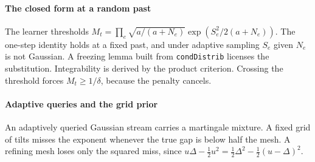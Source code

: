 
\paragraph{The closed form at a random past} The learner thresholds
$M_{t}=\prod_{e}\sqrt{a/(a+N_{e})}\exp(S_{e}^{2}/2(a+N_{e}))$. The one-step identity holds at a
fixed past, and under adaptive sampling $S_{e}$ given $N_{e}$ is not Gaussian. A freezing lemma
built from \texttt{condDistrib} licenses the substitution. Integrability is derived by the
product criterion. Crossing the threshold forces $M_{t}\ge1/\delta$, because the penalty
cancels.


\paragraph{Adaptive queries and the grid prior} An adaptively queried Gaussian stream carries a
martingale mixture. A fixed grid of tilts misses the exponent whenever the true gap is below
half the mesh. A refining mesh loses only the squared miss, since
$u\Delta-\frac12u^{2}=\frac12\Delta^{2}-\frac12(u-\Delta)^{2}$.


